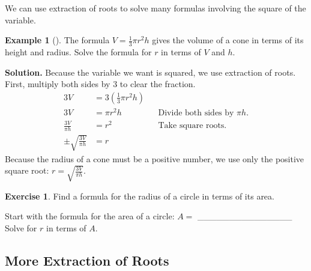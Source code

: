 \documentclass[10pt,]{book}
\theoremstyle{plain}
\theoremstyle{definition}
\theoremstyle{definition}
\theoremstyle{definition}
\newtheorem{example}[theorem]{Example}
\theoremstyle{definition}
\theoremstyle{definition}
\newtheorem{exercise}[theorem]{Exercise}
\numberwithin{equation}{section}
\newcommand{\amp}{ & }
\begin{document}
    We can use extraction of roots to solve many formulas involving the square of the variable.
%
\begin{example}[]\label{example-volume-cone}
The formula \(V = \frac{1}{3} πr^2h\) gives the volume of a cone in terms of its height and radius. Solve the formula for \(r\) in terms of \(V\) and \(h\).
\par\medskip\noindent%
\textbf{Solution.}\quad 
    Because the variable we want is squared, we use extraction of roots. First, multiply both sides by \(3\) to clear the fraction.
    \begin{equation*}
        \begin{align*}
        3V \amp = 3(\frac{1}{3} πr^2h)\\
        3V \amp = πr^2h \amp\amp \text{Divide both sides by } πh.\\
        \frac{3V}{πh}\amp= r^2 \amp\amp \text{Take square roots.}\\
        \pm\sqrt{\frac{3V}{πh}}\amp= r
        \end{align*}
    \end{equation*}
    Because the radius of a cone must be a positive number, we use only the positive square root: 
    \(r = \sqrt{\frac{3V}{πh}}\).
\end{example}
\begin{exercise}\label{exercise-area-circle}
Find a formula for the radius of a circle in terms of its area.%
\par
Start with the formula for the area of a circle: \(A =\) _______________
    Solve for \(r\) in terms of \(A\).%
\end{exercise}
\typeout{************************************************}
\typeout{************************************************}
\subsection[More Extraction of Roots]{More Extraction of Roots}\label{subsection-34}
\end{document}

